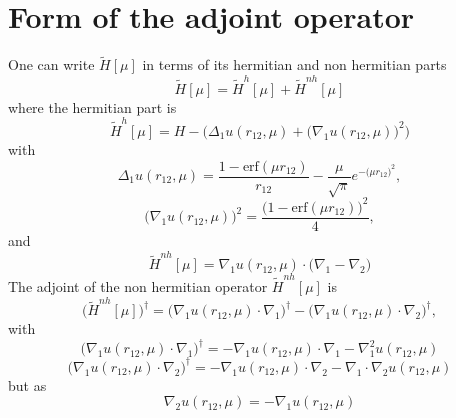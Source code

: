 \documentclass[aip,jcp,reprint,noshowkeys,superscriptaddress]{revtex4-1}
\begin{document}

\section{Form of the adjoint operator}
One can write $\tilde{H}[\mu]$ in terms of its hermitian and non hermitian parts 
\begin{equation}
 \tilde{H}[\mu] = \tilde{H}^h[\mu] + \tilde{H}^{nh}[\mu]
\end{equation}
where the hermitian part is 
\begin{equation}
 \tilde{H}^h[\mu] = H - \bigg( \Delta_1 u(r_{12},\mu) + \big( \nabla_1 u(r_{12},\mu)\big)^2\bigg) 
\end{equation}
with 
\begin{equation}
 \Delta_1 u(r_{12},\mu) = \frac{1 - \text{erf}(\mu r_{12})}{r_{12}} - \frac{\mu}{\sqrt{\pi}} e^{-\big(\mu r_{12} \big)^2},
\end{equation}
\begin{equation}
 \big( \nabla_1 u(r_{12},\mu)\big)^2 = \frac{\bigg(1 - \text{erf}(\mu r_{12})\bigg)^2}{4}, 
\end{equation}
and 
\begin{equation}
 \tilde{H}^{nh}[\mu] = \nabla_{1}u(r_{12},\mu) \cdot \big(\nabla_1 - \nabla_2\big)
\end{equation}
The adjoint of the non hermitian operator $\tilde{H}^{nh}[\mu]$ is 
\begin{equation}
 \bigg( \tilde{H}^{nh}[\mu] \bigg)^\dagger =  \bigg( \nabla_{1}u(r_{12},\mu) \cdot \nabla_1 \bigg)^\dagger - \bigg( \nabla_{1}u(r_{12},\mu) \cdot \nabla_2 \bigg)^\dagger,
\end{equation}
with 
\begin{equation}
 \bigg( \nabla_{1}u(r_{12},\mu) \cdot \nabla_1 \bigg)^\dagger = - \nabla_{1}u(r_{12},\mu) \cdot \nabla_1 
                                                                - \nabla_1^2 u(r_{12},\mu)
\end{equation}
\begin{equation}
 \bigg( \nabla_{1}u(r_{12},\mu) \cdot \nabla_2 \bigg)^\dagger = - \nabla_{1}u(r_{12},\mu) \cdot \nabla_2 
                                                                - \nabla_1 \cdot \nabla_2 u(r_{12},\mu)
\end{equation}
but as 
\begin{equation}
 \nabla_2 u(r_{12},\mu) = - \nabla_{1}u(r_{12},\mu)
\end{equation}
\end{document}
